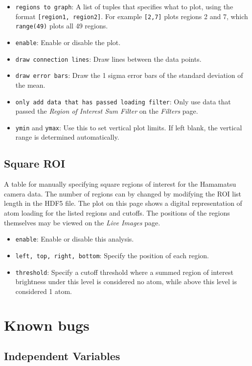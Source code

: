 \documentclass[pdftex,11pt,letterpaper]{article}
\begin{document}
\begin{itemize}
\item \texttt{regions to graph}:  A list of tuples that specifies what to plot, using the format \texttt{[region1, region2]}.  For example \texttt{[2,7]} plots regions 2 and 7, which \texttt{range(49)} plots all 49 regions.
\item \texttt{enable}:  Enable or disable the plot.
\item \texttt{draw connection lines}:  Draw lines between the data points.
\item \texttt{draw error bars}:  Draw the 1 sigma error bars of the standard deviation of the mean.
\item \texttt{only add data that has passed loading filter}:  Only use data that passed the \textit{Region of Interest Sum Filter} on the \textit{Filters} page.
\item \texttt{ymin} and \texttt{ymax}:  Use this to set vertical plot limits.  If left blank, the vertical range is determined automatically.
\end{itemize}

\subsection{Square ROI}
A table for manually specifying square regions of interest for the Hamamatsu camera data.  The number of regions can by changed by modifying the ROI list length in the HDF5 file.  The plot on this page shows a digital representation of atom loading for the listed regions and cutoffs.  The positions of the regions themselves may be viewed on the \textit{Live Images} page.

\begin{itemize}
\item \texttt{enable}:  Enable or disable this analysis.
\item \texttt{left, top, right, bottom}:  Specify the position of each region.
\item \texttt{threshold}:  Specify a cutoff threshold where a summed region of interest brightness under this level is considered no atom, while above this level is considered 1 atom.
\end{itemize}

\section{Known bugs}

\subsection{Independent Variables}
\end{document}
